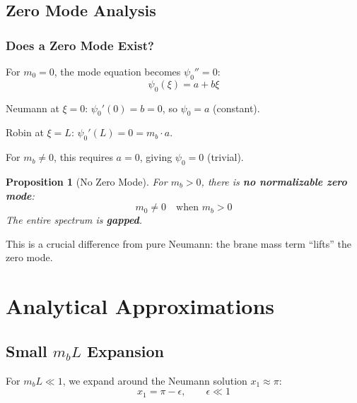 \documentclass[11pt,a4paper]{article}
\newcommand{\mb}{m_b}
\theoremstyle{definition}
\theoremstyle{plain}
\newtheorem{proposition}{Proposition}[section]
\theoremstyle{remark}
\begin{document}
\subsection{Zero Mode Analysis}

\subsubsection{Does a Zero Mode Exist?}

For $m_0 = 0$, the mode equation becomes $\psi_0'' = 0$:
\begin{equation}
\psi_0(\xi) = a + b\xi
\label{eq:zero-mode-general}
\end{equation}

Neumann at $\xi = 0$: $\psi_0'(0) = b = 0$, so $\psi_0 = a$ (constant).

Robin at $\xi = L$: $\psi_0'(L) = 0 = \mb \cdot a$.

For $\mb \neq 0$, this requires $a = 0$, giving $\psi_0 = 0$ (trivial).

\begin{proposition}[No Zero Mode]
\label{prop:no-zero}
For $\mb > 0$, there is \textbf{no normalizable zero mode}:
\begin{equation}
\boxed{m_0 \neq 0 \quad \text{when } \mb > 0}
\label{eq:no-zero-mode}
\end{equation}
The entire spectrum is \textbf{gapped}.
\end{proposition}

This is a crucial difference from pure Neumann: the brane mass term ``lifts'' the zero mode.

\section{Analytical Approximations}
\label{sec:approximations}

\subsection{Small $\mb L$ Expansion}

For $\mb L \ll 1$, we expand around the Neumann solution $x_1 \approx \pi$:
\begin{equation}
x_1 = \pi - \epsilon, \qquad \epsilon \ll 1
\label{eq:small-mb-ansatz}
\end{equation}
\end{document}
